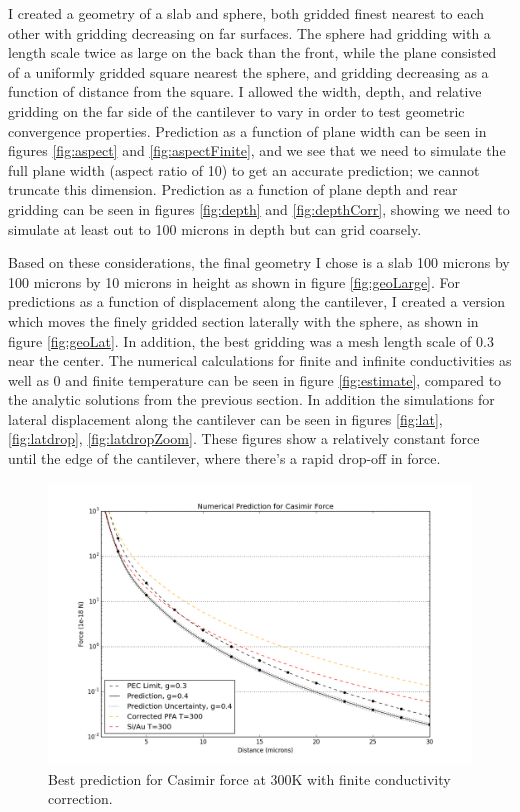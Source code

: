 \documentclass[11pt,traditabstract]{article}
\begin{document}
\pagebreak
I created a geometry of a slab and sphere, both gridded finest nearest to each other with gridding decreasing on far surfaces. The sphere had gridding with a length scale twice as large on the back than the front, while the plane consisted of a uniformly gridded square nearest the sphere, and gridding decreasing as a function of distance from the square. I allowed the width, depth, and relative gridding on the far side of the cantilever to vary in order to test geometric convergence properties. Prediction as a function of plane width can be seen in figures \ref{fig:aspect} and \ref{fig:aspectFinite}, and we see that we need to simulate the full plane width (aspect ratio of 10) to get an accurate prediction; we cannot truncate this dimension. Prediction as a function of plane depth and rear gridding can be seen in figures \ref{fig:depth} and \ref{fig:depthCorr}, showing we need to simulate at least out to 100 microns in depth but can grid coarsely.

Based on these considerations, the final geometry I chose is a slab 100 microns by 100 microns by 10 microns in height as shown in figure \ref{fig:geoLarge}. For predictions as a function of displacement along the cantilever, I created a version which moves the finely gridded section laterally with the sphere, as shown in figure \ref{fig:geoLat}. In addition, the best gridding was a mesh length scale of 0.3 near the center. The numerical calculations for finite and infinite conductivities as well as 0 and finite temperature can be seen in figure \ref{fig:estimate}, compared to the analytic solutions from the previous section. In addition the simulations for lateral displacement along the cantilever can be seen in figures \ref{fig:lat}, \ref{fig:latdrop}, \ref{fig:latdropZoom}. These figures show a relatively constant force until the edge of the cantilever, where there's a rapid drop-off in force.

\begin{figure}[h]
\centering
\includegraphics[width=7in]{prediction}
\caption{Best prediction for Casimir force at 300K with finite conductivity correction.}\label{fig:prediction}
\end{figure}
\end{document}
